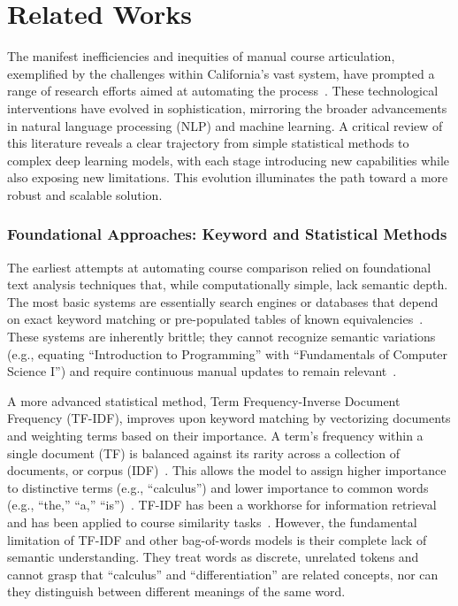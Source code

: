 \chapter{Related Works}

The manifest inefficiencies and inequities of manual course articulation, exemplified by the challenges within California's vast system, have prompted a range of research efforts aimed at automating the process~\cite{ma_course_recommendation_2017, PardosCourse2Vec2019, pardos-articulation-2019, JiangPardosMulti2VecEDM2020,XuPardosSubwordEmbeddings2024}. These technological interventions have evolved in sophistication, mirroring the broader advancements in natural language processing (NLP) and machine learning. A critical review of this literature reveals a clear trajectory from simple statistical methods to complex deep learning models, with each stage introducing new capabilities while also exposing new limitations. This evolution illuminates the path toward a more robust and scalable solution.

    \subsection{Foundational Approaches: Keyword and Statistical Methods}
    The earliest attempts at automating course comparison relied on foundational text analysis techniques that, while computationally simple, lack semantic depth. The most basic systems are essentially search engines or databases that depend on exact keyword matching or pre-populated tables of known equivalencies~\cite{shamrock}. These systems are inherently brittle; they cannot recognize semantic variations (e.g., equating ``Introduction to Programming'' with ``Fundamentals of Computer Science I'') and require continuous manual updates to remain relevant~\cite{shiferaw2024}.

    A more advanced statistical method, Term Frequency-Inverse Document Frequency (TF-IDF), improves upon keyword matching by vectorizing documents and weighting terms based on their importance. A term's frequency within a single document (TF) is balanced against its rarity across a collection of documents, or corpus (IDF)~\cite{AIZAWA200345}. This allows the model to assign higher importance to distinctive terms (e.g., ``calculus'') and lower importance to common words (e.g., ``the,'' ``a,'' ``is'')~\cite{AIZAWA200345}. TF-IDF has been a workhorse for information retrieval and has been applied to course similarity tasks~\cite{AIZAWA200345}. However, the fundamental limitation of TF-IDF and other bag-of-words models is their complete lack of semantic understanding. They treat words as discrete, unrelated tokens and cannot grasp that ``calculus'' and ``differentiation'' are related concepts, nor can they distinguish between different meanings of the same word.

